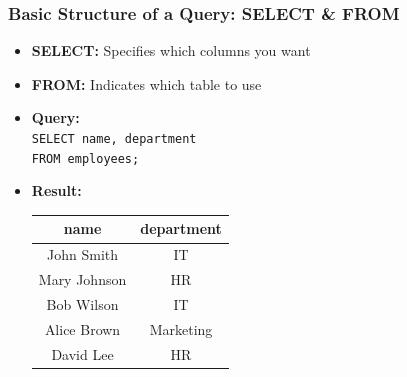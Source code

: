 \documentclass[10pt]{beamer}
\begin{document}
\begin{frame}[fragile]
  \frametitle{Basic Structure of a Query: SELECT \& FROM}
  \begin{itemize}
    \item \textbf{SELECT:} Specifies which columns you want
    \item \textbf{FROM:} Indicates which table to use
  \end{itemize}
  
  \begin{itemize}
    \item \textbf{Query:} \\
    \texttt{SELECT name, department} \\
    \texttt{FROM employees;}
    
    \item \textbf{Result:}
    \begin{center}
      \begin{tabular}{|c|c|}
        \hline
        \textbf{name} & \textbf{department} \\
        \hline
        John Smith & IT \\
        Mary Johnson & HR \\
        Bob Wilson & IT \\
        Alice Brown & Marketing \\
        David Lee & HR \\
        \hline
      \end{tabular}
    \end{center}
  \end{itemize}
\end{frame}
\end{document}
